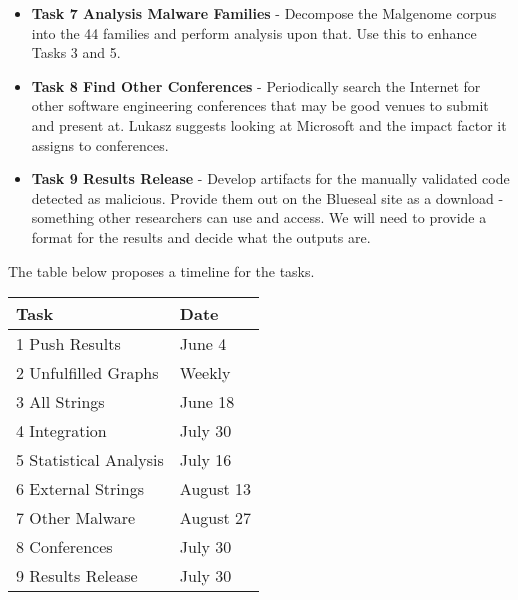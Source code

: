 \begin{itemize}
\item \textbf{Task 7 Analysis Malware Families} - Decompose the Malgenome corpus into the 44 families and perform analysis upon that.  Use this to enhance Tasks 3 and 5.
\item \textbf{Task 8 Find Other Conferences} - Periodically search the Internet for other software engineering conferences that may be good venues to submit and present at.  Lukasz suggests looking at Microsoft and the impact factor it assigns to conferences.
\item \textbf{Task 9 Results Release} - Develop artifacts for the manually validated code detected as malicious.  Provide them out on the Blueseal site as a download - something other researchers can use and access.  We will need to provide a format for the results and decide what the outputs are.
\end{itemize}

The table below proposes a timeline for the tasks.

\begin{tabular*}
{0.45\textwidth}{ l | l   }
  \hline
  Task & Date \\
  \hline
  {1 Push Results}  & June 4  \\
  \hline
  {2 Unfulfilled Graphs}  & Weekly  \\
  \hline
  {3 All Strings}   & June 18  \\
  \hline
  {4 Integration}  & July 30  \\
  \hline
  {5 Statistical Analysis}   & July 16  \\
  \hline
  {6 External Strings}  & August 13  \\
  \hline
  {7 Other Malware}  & August 27  \\
  \hline
  {8 Conferences}  & July 30  \\
  \hline
  {9 Results Release}  & July 30  \\
  \hline
\end{tabular*}

